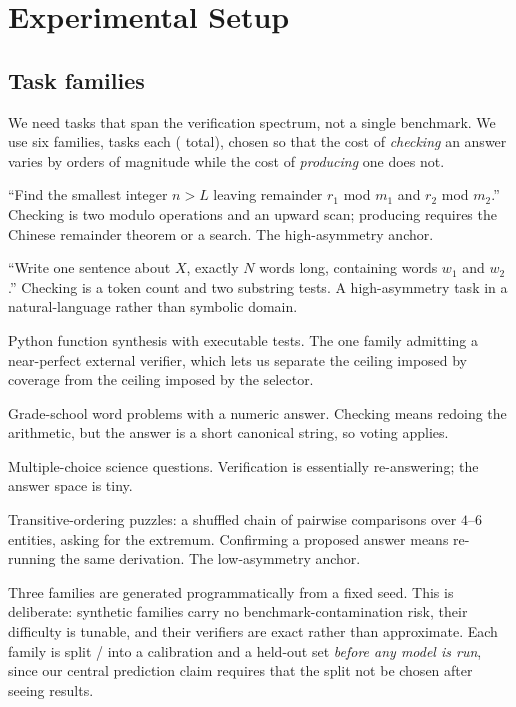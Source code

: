 \section{Experimental Setup}
\label{sec:setup}

\subsection{Task families}

We need tasks that span the verification spectrum, not a single benchmark. We
use six families, \nPerFamily{} tasks each (\nTasks{} total), chosen so that the
cost of \emph{checking} an answer varies by orders of magnitude while the cost
of \emph{producing} one does not.

\begin{description}[leftmargin=0pt,itemsep=2pt,topsep=3pt,font=\normalfont\itshape]
\item[CSP (synthetic).] ``Find the smallest integer $n>L$ leaving remainder
  $r_1$ mod $m_1$ and $r_2$ mod $m_2$.'' Checking is two modulo operations and
  an upward scan; producing requires the Chinese remainder theorem or a search.
  The high-asymmetry anchor.
\item[WordCon (synthetic).] ``Write one sentence about $X$, exactly $N$ words
  long, containing words $w_1$ and $w_2$.'' Checking is a token count and two
  substring tests. A high-asymmetry task in a natural-language rather than
  symbolic domain.
\item[MBPP \citep{austin2021mbpp}.] Python function synthesis with executable
  tests. The one family admitting a near-perfect external verifier, which lets
  us separate the ceiling imposed by coverage from the ceiling imposed by the
  selector.
\item[GSM8K \citep{cobbe2021gsm8k}.] Grade-school word problems with a numeric
  answer. Checking means redoing the arithmetic, but the answer is a short
  canonical string, so voting applies.
\item[ARC-Challenge \citep{clark2018arc}.] Multiple-choice science questions.
  Verification is essentially re-answering; the answer space is tiny.
\item[Logic (synthetic).] Transitive-ordering puzzles: a shuffled chain of
  pairwise comparisons over $4$--$6$ entities, asking for the extremum.
  Confirming a proposed answer means re-running the same derivation. The
  low-asymmetry anchor.
\end{description}

Three families are generated programmatically from a fixed seed. This is
deliberate: synthetic families carry no benchmark-contamination risk, their
difficulty is tunable, and their verifiers are exact rather than approximate.
Each family is split \nCalib{}/\nTest{} into a calibration and a held-out set
\emph{before any model is run}, since our central prediction claim requires
that the split not be chosen after seeing results.


